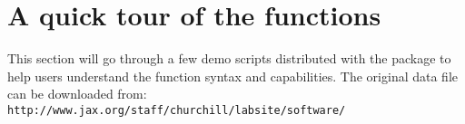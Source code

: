 \newpage
\section{A quick tour of the functions}
This section will go through a few demo scripts 
distributed with the package to help users 
understand the function syntax and capabilities. 
The original data file can be 
downloaded from: \\
{\tt http://www.jax.org/staff/churchill/labsite/software/}

